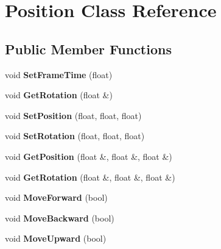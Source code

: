 \hypertarget{class_position}{\section{Position Class Reference}
\label{class_position}
}
\subsection*{Public Member Functions}
\begin{DoxyCompactItemize}
\item 
\hypertarget{class_position_a4a17667679c8096f5b79edeb559ba1fe}{void {\bfseries Set\-Frame\-Time} (float)}\label{class_position_a4a17667679c8096f5b79edeb559ba1fe}

\item 
\hypertarget{class_position_abb620d733b71a9ff9a74b079ddb50c3f}{void {\bfseries Get\-Rotation} (float \&)}\label{class_position_abb620d733b71a9ff9a74b079ddb50c3f}

\item 
\hypertarget{class_position_a4387e9dd2244a5c602361981fbdb650d}{void {\bfseries Set\-Position} (float, float, float)}\label{class_position_a4387e9dd2244a5c602361981fbdb650d}

\item 
\hypertarget{class_position_a08390e60afb24be6df0c007affc7a3b2}{void {\bfseries Set\-Rotation} (float, float, float)}\label{class_position_a08390e60afb24be6df0c007affc7a3b2}

\item 
\hypertarget{class_position_a383aff1137d1dbadf543a91e4a84f201}{void {\bfseries Get\-Position} (float \&, float \&, float \&)}\label{class_position_a383aff1137d1dbadf543a91e4a84f201}

\item 
\hypertarget{class_position_a737348ea17e32c4bfa090c09e4156eef}{void {\bfseries Get\-Rotation} (float \&, float \&, float \&)}\label{class_position_a737348ea17e32c4bfa090c09e4156eef}

\item 
\hypertarget{class_position_a871c2a48932e004715f28acae05c4448}{void {\bfseries Move\-Forward} (bool)}\label{class_position_a871c2a48932e004715f28acae05c4448}

\item 
\hypertarget{class_position_a149669f0d5b4ad25bd7fd38ca9a1718d}{void {\bfseries Move\-Backward} (bool)}\label{class_position_a149669f0d5b4ad25bd7fd38ca9a1718d}

\item 
\hypertarget{class_position_a08749df1e288d81158018cec5f227e53}{void {\bfseries Move\-Upward} (bool)}\label{class_position_a08749df1e288d81158018cec5f227e53}


\end{DoxyCompactItemize}
